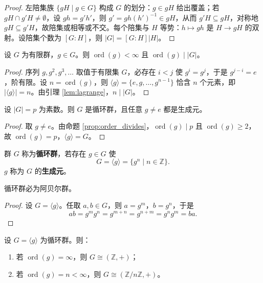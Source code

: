 \begin{proof}
左陪集族 $\{gH\mid g\in G\}$ 构成 $G$ 的划分：$g\in gH$ 给出覆盖；若 $gH\cap g'H\neq\emptyset$，设 $gh=g'h'$，则 $g'=gh(h')^{-1}\in gH$，从而 $g'H\subseteq gH$，对称地 $gH\subseteq g'H$，故陪集或相等或不交。每个陪集与 $H$ 等势：$h\mapsto gh$ 是 $H\to gH$ 的双射。设陪集个数为 $[G:H]$，则 $|G|=[G:H]|H|$。
\end{proof}

\begin{proposition}[有限群中元素的阶]\label{prop:order_divides}
设 $G$ 为有限群，$g\in G$。则 $\operatorname{ord}(g)<\infty$ 且 $\operatorname{ord}(g)\mid |G|$。
\end{proposition}

\begin{proof}
序列 $g,g^2,g^3,\dots$ 取值于有限集 $G$，必存在 $i<j$ 使 $g^i=g^j$，于是 $g^{j-i}=e$，阶有限。设 $n=\operatorname{ord}(g)$，则 $\langle g\rangle=\{e,g,\dots,g^{n-1}\}$ 恰含 $n$ 个元素，即 $|\langle g\rangle|=n$。由引理 \ref{lem:lagrange}，$n\mid |G|$。
\end{proof}

\begin{corollary}[素数阶群是循环群]\label{cor:prime_order}
设 $|G|=p$ 为素数。则 $G$ 是循环群，且任意 $g\neq e$ 都是生成元。
\end{corollary}

\begin{proof}
取 $g\neq e$。由命题 \ref{prop:order_divides}，$\operatorname{ord}(g)\mid p$ 且 $\operatorname{ord}(g)\ge 2$，故 $\operatorname{ord}(g)=p$，$\langle g\rangle=G$。
\end{proof}

\begin{definition}[循环群]\label{def:cyclic_group}
群 $G$ 称为\textbf{循环群}，若存在 $g\in G$ 使
\[
G=\langle g\rangle=\{g^n\mid n\in\mathbb{Z}\}.
\]
$g$ 称为 $G$ 的\textbf{生成元}。
\end{definition}

\begin{proposition}[循环群是阿贝尔群]\label{prop:cyclic_abelian}
循环群必为阿贝尔群。
\end{proposition}

\begin{proof}
设 $G=\langle g\rangle$。任取 $a,b\in G$，则 $a=g^m$，$b=g^n$，于是
\[
ab=g^m g^n=g^{m+n}=g^{n+m}=g^n g^m=ba.
\]
\end{proof}

\begin{proposition}[循环群的分类]\label{prop:cyclic_classification}
设 $G=\langle g\rangle$ 为循环群。则：
\begin{enumerate}[label=(\roman*)]
    \item 若 $\operatorname{ord}(g)=\infty$，则 $G\cong(\mathbb{Z},+)$；
    \item 若 $\operatorname{ord}(g)=n<\infty$，则 $G\cong(\mathbb{Z}/n\mathbb{Z},+)$。
\end{enumerate}
\end{proposition}

